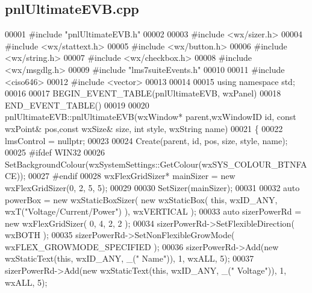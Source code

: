 \subsection{pnl\+Ultimate\+E\+V\+B.\+cpp}
\label{pnlUltimateEVB_8cpp_source}

\begin{DoxyCode}
00001 \textcolor{preprocessor}{#include "pnlUltimateEVB.h"}
00002 
00003 \textcolor{preprocessor}{#include <wx/sizer.h>}
00004 \textcolor{preprocessor}{#include <wx/stattext.h>}
00005 \textcolor{preprocessor}{#include <wx/button.h>}
00006 \textcolor{preprocessor}{#include <wx/string.h>}
00007 \textcolor{preprocessor}{#include <wx/checkbox.h>}
00008 \textcolor{preprocessor}{#include <wx/msgdlg.h>}
00009 \textcolor{preprocessor}{#include "lms7suiteEvents.h"}
00010 
00011 \textcolor{preprocessor}{#include <ciso646>}
00012 \textcolor{preprocessor}{#include <vector>}
00013 
00014 
00015 \textcolor{keyword}{using namespace }std;
00016 
00017 BEGIN\_EVENT\_TABLE(pnlUltimateEVB, wxPanel)
00018 END\_EVENT\_TABLE()
00019 
00020 pnlUltimateEVB::pnlUltimateEVB(wxWindow* parent,wxWindowID \textcolor{keywordtype}{id}, const wxPoint& pos,const wxSize& 
      size, \textcolor{keywordtype}{int} style, wxString name)
00021 \{
00022     lmsControl = \textcolor{keyword}{nullptr};
00023 
00024     Create(parent, \textcolor{keywordtype}{id}, pos, size, style, name);
00025 \textcolor{preprocessor}{#ifdef WIN32}
00026     SetBackgroundColour(wxSystemSettings::GetColour(wxSYS\_COLOUR\_BTNFACE));
00027 \textcolor{preprocessor}{#endif}
00028     wxFlexGridSizer* mainSizer = \textcolor{keyword}{new} wxFlexGridSizer(0, 2, 5, 5);
00029 
00030     SetSizer(mainSizer);
00031 
00032     \textcolor{keyword}{auto} powerBox = \textcolor{keyword}{new} wxStaticBoxSizer( \textcolor{keyword}{new} wxStaticBox( \textcolor{keyword}{this}, wxID\_ANY, wxT(\textcolor{stringliteral}{"Voltage/Current/Power"}) ), 
      wxVERTICAL );
00033     \textcolor{keyword}{auto} sizerPowerRd = \textcolor{keyword}{new} wxFlexGridSizer( 0, 4, 2, 2 );
00034     sizerPowerRd->SetFlexibleDirection( wxBOTH );
00035     sizerPowerRd->SetNonFlexibleGrowMode( wxFLEX\_GROWMODE\_SPECIFIED );
00036     sizerPowerRd->Add(\textcolor{keyword}{new} wxStaticText(\textcolor{keyword}{this}, wxID\_ANY, \_(\textcolor{stringliteral}{" Name"})), 1, wxALL, 5);
00037     sizerPowerRd->Add(\textcolor{keyword}{new} wxStaticText(\textcolor{keyword}{this}, wxID\_ANY, \_(\textcolor{stringliteral}{" Voltage"})), 1, wxALL, 5);

\end{DoxyCode}
